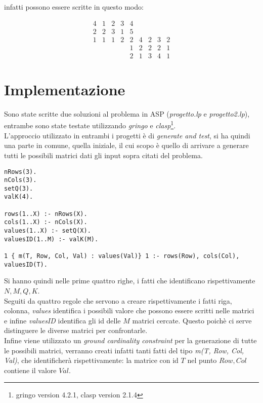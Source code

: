 \documentclass{article}
\begin{document}
infatti possono essere scritte in questo modo:
            
$$
\begin{array}{cccccccccc}
4 & 1 & 2 & 3 & 4 &   &   &   &   \\
2 & 2 & 3 & 1 & 5 &   &   &   &   \\
1 & 1 & 1 & 2 & 2 & 4 & 2 & 3 & 2 \\
  &   &   &   & 1 & 2 & 2 & 2 & 1 \\
  &   &   &   & 2 & 1 & 3 & 4 & 1
\end{array}
$$

\section*{Implementazione}
Sono state scritte due soluzioni al problema in ASP (\textit{progetto.lp} e \textit{progetto2.lp}), entrambe sono state testate utilizzando \textit{gringo} e \textit{clasp}\footnote{gringo version 4.2.1, clasp version 2.1.4}.\\

L'approccio utilizzato in entrambi i progetti è di \textit{generate and test}, si ha quindi una parte in comune, quella iniziale, il cui scopo è quello di arrivare a generare tutti le possibili matrici dati gli input sopra citati del problema.

\begin{lstlisting}
nRows(3).
nCols(3).
setQ(3).
valK(4).

rows(1..X) :- nRows(X).
cols(1..X) :- nCols(X).
values(1..X) :- setQ(X).
valuesID(1..M) :- valK(M).

1 { m(T, Row, Col, Val) : values(Val)} 1 :- rows(Row), cols(Col), valuesID(T).
\end{lstlisting}

Si hanno quindi nelle prime quattro righe, i fatti che identificano rispettivamente $N, M, Q, K$.\\
Seguiti da quattro regole che servono a creare rispettivamente i fatti riga, colonna, \textit{values} identifica i possibili valore che possono essere scritti nelle matrici e infine \textit{valuesID} identifica gli id delle $M$ matrici cercate. Questo poichè ci serve distinguere le diverse matrici per confrontarle.\\
Infine viene utilizzato un \textit{ground cardinality constraint} per la generazione di tutte le possibili matrici, verranno creati infatti tanti fatti del tipo \textit{m(T, Row, Col, Val)}, che identificherà rispettivamente: la matrice con id $T$ nel punto $Row, Col$ contiene il valore $Val$.
\end{document}
